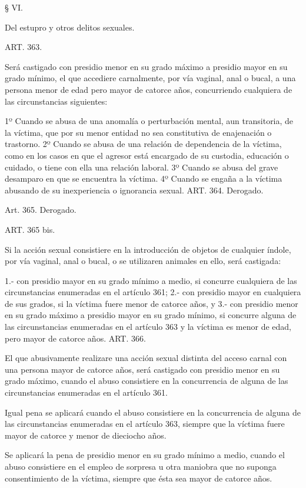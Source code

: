     § VI.

Del estupro y otros delitos sexuales.


    ART. 363.

    Será castigado con presidio menor en su grado máximo a presidio mayor en su grado mínimo, el que accediere carnalmente, por vía vaginal, anal o bucal, a una persona menor de edad pero mayor de catorce años, concurriendo cualquiera de las circunstancias siguientes:

    1º Cuando se abusa de una anomalía o perturbación mental, aun transitoria, de la víctima, que por su menor entidad no sea constitutiva de enajenación o trastorno.
    2º Cuando se abusa de una relación de dependencia de la víctima, como en los casos en que el agresor está encargado de su custodia, educación o cuidado, o tiene con ella una relación laboral.
    3º Cuando se abusa del grave desamparo en que se encuentra la víctima.
    4º Cuando se engaña a la víctima abusando de su inexperiencia o ignorancia sexual.
    ART. 364.    Derogado.

    Art. 365.    Derogado.


    ART. 365 bis.

    Si la acción sexual consistiere en la introducción de objetos de cualquier índole, por vía vaginal, anal o bucal, o se utilizaren animales en ello, será castigada:

    1.- con presidio mayor en su grado mínimo a medio, si concurre cualquiera de las circunstancias enumeradas en el artículo 361;
    2.- con presidio mayor en cualquiera de sus grados, si la víctima fuere menor de catorce años, y 3.- con presidio menor en su grado máximo a presidio mayor en su grado mínimo, si concurre alguna de las circunstancias enumeradas en el artículo 363 y la víctima es menor de edad, pero mayor de catorce años.
    ART. 366.

    El que abusivamente realizare una acción sexual distinta del acceso carnal con una persona mayor de catorce años, será castigado con presidio menor en su grado máximo, cuando el abuso consistiere en la concurrencia de alguna de las circunstancias enumeradas en el artículo 361.

    Igual pena se aplicará cuando el abuso consistiere en la concurrencia de alguna de las circunstancias enumeradas en el artículo 363, siempre que la víctima fuere mayor de catorce y menor de dieciocho años.

    Se aplicará la pena de presidio menor en su grado mínimo a medio, cuando el abuso consistiere en el empleo de sorpresa u otra maniobra que no suponga consentimiento de la víctima, siempre que ésta sea mayor de catorce años.

